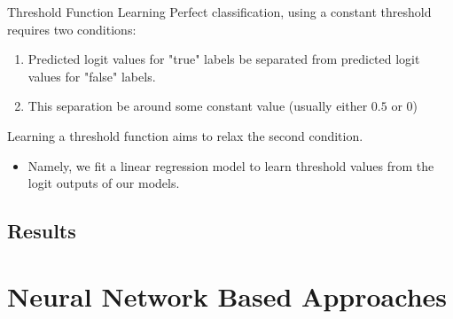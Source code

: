 \documentclass{beamer}
\begin{document}
\begin{frame}[t]{Threshold Function Learning}
    Perfect classification, using a constant threshold requires two conditions:
    \vspace{0.25cm}
    \begin{enumerate}
        \item 
        Predicted logit values for "true" labels be separated from predicted logit values for "false" labels.
        
        \item
        This separation be around some constant value (usually either $0.5$ or $0$)
    \end{enumerate}
    
    \vspace{0.15cm}
    Learning a threshold function aims to relax the second condition.
    
    \begin{itemize}
        \item[\rightarrow] 
        Namely, we fit a linear regression model to learn threshold values from the logit outputs of our models.
    \end{itemize}
\end{frame}

\subsection{Results}

\section{Neural Network Based Approaches}
\end{document}
